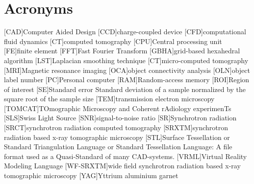     \chapter*{Acronyms}
	\begin{acronym}[ACRONYM]
		[CAD]{Computer Aided Design}
		[CCD]{charge-coupled device}
		[CFD]{computational fluid dynamics}
		[CT]{computed tomography}
		[CPU]{Central processing unit}
		[FE]{finite element}
		[FFT]{Fast Fourier Transform}
		{grid-based hexahedral algorithm}
		[LST]{Laplacian smoothing technique}
		[\micro CT]{micro-computed tomography}
		[MRI]{Magnetic resonance imaging}
		[OCA]{object connectivity analysis}
		[OLN]{object label number}
		[PC]{Personal computer}
		[RAM]{Random-access memory}
		[ROI]{Region of interest}
		[SE]{Standard error} Standard deviation of a sample normalized by the square root of the sample size
		[TEM]{transmission electron microscopy}
		[TOMCAT]{TOmographic Microscopy and Coherent rAdiology experimenTs}
		[SLS]{Swiss Light Source}
		[SNR]{signal-to-noise ratio}
		[SR]{Synchrotron radiation}
		{synchrotron radiation computed tomography}
		[SRXTM]{synchrotron radiation based x-ray tomographic microscopy}
		[STL]{Surface Tessellation or Standard Triangulation Language or Standard Tessellation Language}: A file format used as a Quasi-Standard of many \acs{CAD}-systems.
		{Virtual Reality Modeling Language}
		[WF-SRXTM]{wide field synchrotron radiation based x-ray tomographic microscopy}
		[YAG]{Yttrium aluminium garnet}
	\end{acronym}
\endgroup

\cleardoublepage